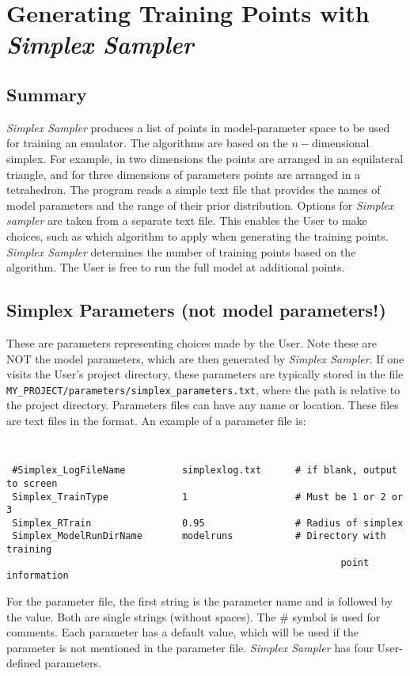 \documentclass[main.tex]{subfiles}
\begin{document}
\setcounter{section}{2}

\section{Generating Training Points with {\it Simplex Sampler}}\label{sec:simplex}

\subsection{Summary}
{\it Simplex Sampler} produces a list of points in model-parameter space to be used for training an emulator. The algorithms are based on the $n-$dimensional simplex. For example, in two dimensions the points are arranged in an equilateral triangle, and for three dimensions of parameters points are arranged in a tetrahedron. The program reads a simple text file that provides the names of model parameters and the range of their prior distribution. Options for {\it Simplex sampler} are taken from a separate text file. This enables the User to make choices, such as which algorithm to apply when generating the training points. {\it Simplex Sampler} determines the number of training points based on the algorithm. The User is free to run the full model at additional points.

\subsection{Simplex Parameters (not model parameters!)}

These are parameters representing choices made by the User. Note these are NOT the model parameters, which are then generated by {\it Simplex Sampler}. If one visits the User's project directory, these parameters are typically stored in the file   {\tt MY\_PROJECT/parameters/simplex\_parameters.txt}, where the path is relative to the project directory.
Parameters files can have any name or location. These files are text files in the format. An example of a parameter file is:
{\tt
\begin{verbatim}
 #Simplex_LogFileName          simplexlog.txt      # if blank, output to screen
 Simplex_TrainType             1                   # Must be 1 or 2 or 3
 Simplex_RTrain                0.95                # Radius of simplex
 Simplex_ModelRunDirName       modelruns           # Directory with training
                                                           point information
\end{verbatim}
}
For the parameter file, the first string is the parameter name and is followed by the value. Both are single strings (without spaces). The \# symbol is used for comments. Each parameter has a default value, which will be used if the parameter is not mentioned in the parameter file.  {\it Simplex Sampler} has four User-defined parameters.
    
\end{document}
